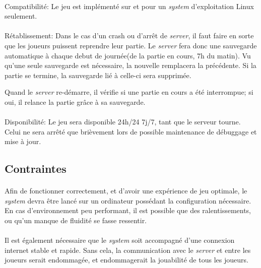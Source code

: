 \documentclass[a4paper,11pt]{report}
\begin{document}
\paragraph{}Compatibilité:  \newline
Le jeu est implémenté sur et pour un \textit{system} d'exploitation Linux seulement.

\paragraph{}Rétablissement:  \newline
Dans le cas d'un crash ou d'arrêt de \textit{server}, il faut faire en sorte que les joueurs puissent reprendre leur partie. Le \textit{server} fera donc une sauvegarde automatique à chaque debut de journée(de la partie en cours, 7h du matin). 
Vu qu'une seule sauvegarde est nécessaire, la nouvelle remplacera la précédente.
Si la partie se termine, la sauvegarde lié à celle-ci sera supprimée.

Quand le \textit{server} re-démarre, il vérifie si une partie en cours a été interrompue; si oui, il relance la partie grâce à sa sauvegarde.

\paragraph{}Disponibilité:  \newline
Le jeu sera disponible 24h/24 7j/7, tant que le serveur tourne. Celui ne sera arrêté que brièvement lors de possible maintenance de débuggage et mise à jour.

\subsection{Contraintes}
\paragraph{}
Afin de fonctionner correctement, et d’avoir une expérience de jeu optimale, le \textit{system} devra être lancé sur un ordinateur possédant la configuration nécessaire.
En cas d’environnement peu performant, il est possible que des ralentissements, ou qu’un manque de fluidité se fasse ressentir.
\paragraph{}
Il est également nécessaire que le \textit{system} soit accompagné d’une connexion internet stable et rapide.
Sans cela, la communication avec le \textit{server} et entre les joueurs serait endommagée, et endommagerait la jouabilité de tous les joueurs.
\end{document}
